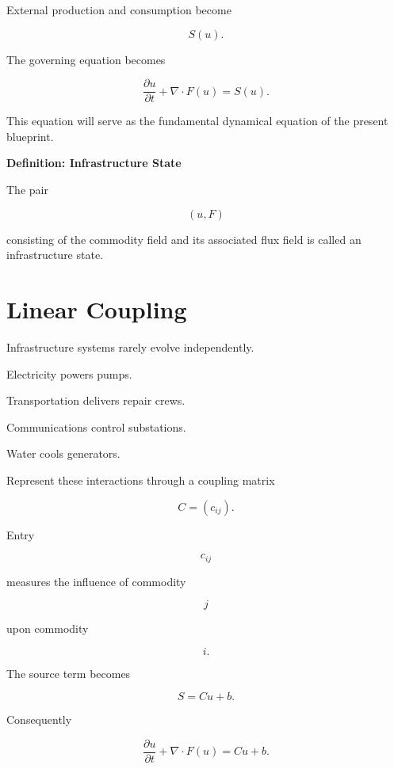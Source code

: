 \documentclass[11pt,fleqn]{book}
\numberwithin{equation}{chapter}
\newenvironment{definition}[1]
  {\begin{definitionEnv}
   \noindent\textbf{Definition: #1}\par\smallskip}
  {\end{definitionEnv}}
\theoremstyle{plain}
\theoremstyle{definition}
\theoremstyle{remark}
\begin{document}
External production and consumption become

\[
S(u).
\]

The governing equation becomes

\[
\boxed{
\frac{\partial u}{\partial t}
+
\nabla\cdot F(u)
=
S(u).
}
\]

This equation will serve as the fundamental dynamical equation of the
present blueprint.


\begin{definition}{Infrastructure State}

The pair

\[
(u,F)
\]

consisting of the commodity field and its associated flux field is called
an infrastructure state.

\end{definition}


\section{Linear Coupling}

Infrastructure systems rarely evolve independently.

Electricity powers pumps.

Transportation delivers repair crews.

Communications control substations.

Water cools generators.

Represent these interactions through a coupling matrix

\[
C
=
(c_{ij}).
\]

Entry

\[
c_{ij}
\]

measures the influence of commodity

\[
j
\]

upon commodity

\[
i.
\]

The source term becomes

\[
S
=
Cu
+
b.
\]

Consequently

\[
\boxed{
\frac{\partial u}{\partial t}
+
\nabla\cdot F(u)
=
Cu+b.
}
\]

\end{document}
